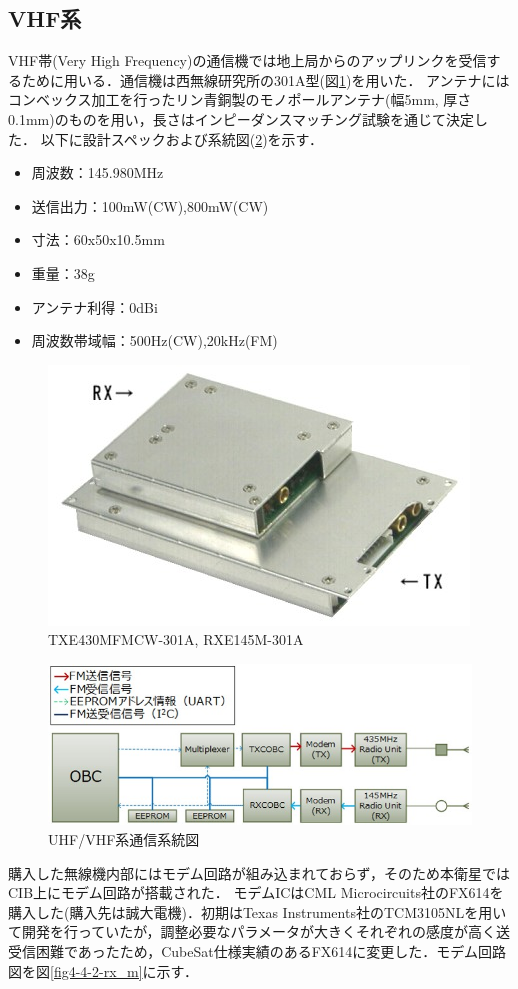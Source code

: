 \subsection{VHF系}
VHF帯(Very High Frequency)の通信機では地上局からのアップリンクを受信するために用いる．通信機は西無線研究所の301A型(図\ref{fig4-2-ntrx})を用いた．
アンテナにはコンベックス加工を行ったリン青銅製のモノポールアンテナ(幅5mm, 厚さ0.1mm)のものを用い，長さはインピーダンスマッチング試験を通じて決定した．
以下に設計スペックおよび系統図(\ref{fig4-2-3})を示す．
\begin{itemize}
	\item 周波数：145.980MHz
	\item 送信出力：100mW(CW),800mW(CW)
	\item 寸法：60x50x10.5mm
	\item 重量：38g
	\item アンテナ利得：0dBi
	\item 周波数帯域幅：500Hz(CW),20kHz(FM)
\end{itemize}
\begin{figure}[htbp]
	\centering
	\includegraphics[width=0.5\linewidth]{03/fig/4-2-ntrx.jpg}
	\caption{TXE430MFMCW-301A, RXE145M-301A}
	\label{fig4-2-ntrx}
\end{figure}
\begin{figure}[H]
	\centering
	\includegraphics[scale=0.6]{03/fig/4-2-3.jpg}
	\caption{UHF/VHF系通信系統図}
	\label{fig4-2-3}
\end{figure}

購入した無線機内部にはモデム回路が組み込まれておらず，そのため本衛星ではCIB上にモデム回路が搭載された．
モデムICはCML Microcircuits社のFX614を購入した(購入先は誠大電機)．初期はTexas Instruments社のTCM3105NLを用いて開発を行っていたが，調整必要なパラメータが大きくそれぞれの感度が高く送受信困難であったため，CubeSat仕様実績のあるFX614に変更した．モデム回路図を図\ref{fig4-4-2-rx_m}に示す．

